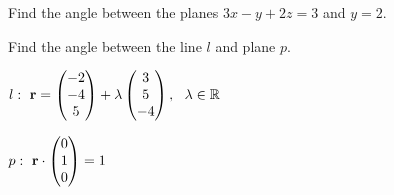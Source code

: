 \par
{}\par
\noindent\begin{minipage}[t]{0.48\textwidth}
\exlab Find the angle between the planes $3x-y+2z=3$ and $y=2$.\par
{}
\end{minipage}\hfill
\begin{minipage}[t]{0.48\textwidth}
\exlab Find the angle between the line $l$ and plane $p$.\par
\noindent\hfill$l:\ \vv r=\cv{-2}{-4}5+\lambda\cv35{-4},\ \ \lambda\in\mathbb R$\hfill\null\par
\noindent\hfill$p:\ \mathbf{r}\cdot\begin{pmatrix}0\\1\\0\end{pmatrix}=1$\hfill\null\par
{}
\end{minipage}
